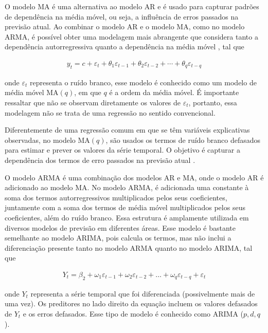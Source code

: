 O modelo MA é uma alternativa ao modelo AR e é usado para capturar padrões de dependência na média móvel, ou seja, a influência de erros passados na previsão atual. Ao combinar o modelo AR e o modelo MA, como no modelo ARMA, é possível obter uma modelagem mais abrangente que considera tanto a dependência autorregressiva quanto a dependência na média móvel \cite{arima}, tal que
  
 \begin{eqnarray}
 	y_t=c+\varepsilon_t+\theta_1 \varepsilon_{t-1}+\theta_2 \varepsilon_{t-2}+\cdots+\theta_q \varepsilon_{t-q}\label{eq:ma}
 \end{eqnarray}
 
\noindent onde $\varepsilon_t$ representa o ruído branco, esse modelo é conhecido como um modelo de média móvel MA$(q)$, em que $q$ é a ordem da média móvel. É importante ressaltar que não se observam diretamente os valores de $\varepsilon_t$, portanto, essa modelagem não se trata de uma regressão no sentido convencional.
 
Diferentemente de uma regressão comum em que se têm variáveis explicativas observadas, no modelo MA$(q)$, são usados os termos de ruído branco defasados para estimar e prever os valores da série temporal. O objetivo é capturar a dependência dos termos de erro passados na previsão atual \cite{arima}.
 
O modelo ARMA é uma combinação dos modelos AR  e MA, onde o modelo AR é adicionado ao modelo MA. No modelo ARMA, é adicionada uma constante à soma dos termos autorregressivos multiplicados pelos seus coeficientes, juntamente com a soma dos termos de média móvel multiplicados pelos seus coeficientes, além do ruído branco. Essa estrutura é amplamente utilizada em diversos modelos de previsão em diferentes áreas. Esse modelo é bastante semelhante ao modelo ARIMA, pois calcula os termos, mas não inclui a diferenciação presente tanto no modelo ARMA quanto no modelo ARIMA, tal que
 
 \begin{eqnarray}
 	Y_t = \beta_2 + \omega_1\varepsilon_{t-1} + \omega_2 \varepsilon_{t-2} +\ldots+ \omega_q \varepsilon_{t-q} + \varepsilon_t \label{arima}
 \end{eqnarray}
 
 \noindent onde $Y_t$ representa a série temporal que foi diferenciada (possivelmente mais de uma vez). Os preditores no lado direito da equação incluem os valores defasados de $Y_t$ e os erros defasados. Esse tipo de modelo é conhecido como ARIMA ($p, d, q$).
 
